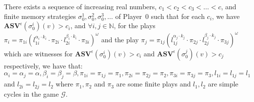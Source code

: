 \begin{proposition}
    \label{PropConvergenceStrategies}
    There exists a sequence of increasing real numbers, $c_1 < c_2 < c_3 < \dotsc < c$, and finite memory strategies $\sigma_0^1, \sigma_0^2, \sigma_0^3, \dotsc$ of Player~0 such that for each $c_i$, we have $\mathbf{ASV}^{\epsilon} (\sigma_0^i)(v) > c_i$, and  $\forall i, j \in \mathbb{N}$, for the plays $\pi_i= \pi_{1i}(l^{\alpha_i \cdot k_i}_{1i} \cdot \pi_{2i} \cdot l^{\beta_i \cdot k_i}_{2i} \cdot \pi_{3i})^{\omega}$ and the play $\pi_j= \pi_{1j}(l^{\alpha_j \cdot k_j}_{1j} \cdot \pi_{2j} \cdot l^{\beta_j \cdot k_j}_{2j} \cdot \pi_{3j})^{\omega}$ which are witnesses for $ \mathbf{ASV}^{\epsilon}(\sigma_0^i)(v) > c_i$ and $ \mathbf{ASV}^{\epsilon}(\sigma_0^j)(v) > c_j$ respectively, we have that:
    $\alpha_i = \alpha_j = \alpha, \beta_i = \beta_j = \beta, \pi_{1i} = \pi_{1j} = \pi_1, \pi_{2i} = \pi_{2j} = \pi_2, \pi_{3i} = \pi_{3j} = \pi_3, l_{1i} = l_{1j} = l_1$ and $l_{2i} = l_{2j} = l_2$ where $\pi_1, \pi_2$ and $\pi_3$ are some finite plays and $l_1, l_2$ are simple cycles in the game $\mathcal{G}$.
\end{proposition}
